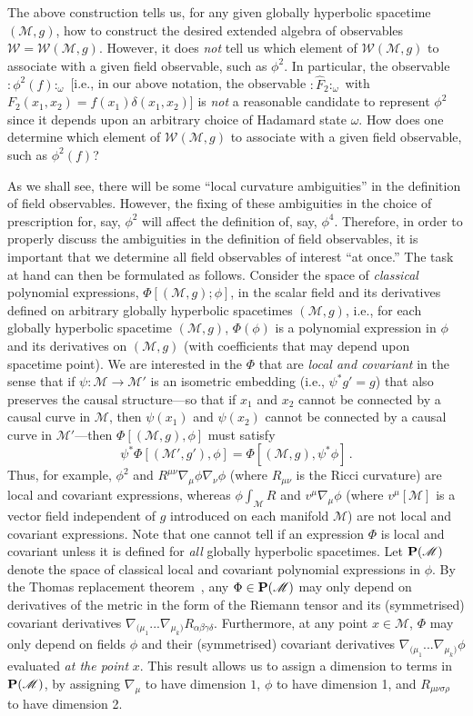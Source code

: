 \documentclass[12pt]{article}
\newcommand{\eW}{\mathscr{W}}
\newcommand{\M}{\mathscr{M}}
\renewcommand{\O}{\Phi}
\renewcommand{\P}{{\bf P}}
\theoremstyle{plain}
\theoremstyle{definition}
\def\ben{\begin{equation}}
\def\een{\end{equation}}
\begin{document}
The above construction tells us, for any given globally hyperbolic spacetime $(\M, g)$, how to construct the desired
extended algebra of observables $\eW = \eW(\M,g)$. However, it does {\em not} tell us which element of $\eW(\M,g)$ to associate with a given field observable, such as $\phi^2$. In particular, the observable $:\phi^2(f):_{\omega}$ [i.e.,
in our above notation, the observable $:\hat{F}_2:_{\omega}$ with $F_2(x_1,x_2) = f(x_1) \delta(x_1,x_2)$] is {\em not} a reasonable
candidate to represent $\phi^2$ since it depends upon an arbitrary choice of Hadamard state $\omega$. How does one
determine which element of $\eW(\M,g)$ to associate with a given field observable, such as $\phi^2(f)$?

As we shall see, there will be some ``local curvature ambiguities'' in the definition of field observables. However, the
fixing of these ambiguities in the choice of prescription for, say, $\phi^2$ will affect the definition of, say, $\phi^4$. Therefore, in order to properly discuss the ambiguities in the definition of field observables,
it is important that we determine all field observables of interest ``at once.'' The task at hand can then be formulated
as follows. Consider the space of {\it classical} polynomial expressions,
$\O[(\M, g);\phi]$, in the scalar field and its derivatives defined on arbitrary globally hyperbolic spacetimes $(\M,g)$,
i.e., for each globally hyperbolic spacetime $(\M,g)$, $\O(\phi)$ is a polynomial expression in $\phi$ and its derivatives
on $(\M,g)$ (with coefficients that may depend upon spacetime point). We are interested in the $\O$ that are {\it local and covariant}
in the sense that if $\psi:\M \to \M'$ is an isometric embedding (i.e., $\psi^* g'=g$) that also preserves the causal structure---so that if $x_1$ and $x_2$ cannot be connected by a causal curve in $\M$, then $\psi(x_1)$ and $\psi(x_2)$ cannot
be connected by a causal curve in $\M'$---then $\O[(\M, g),\phi]$ must satisfy
\ben
\psi^* \O[(\M',g'), \phi] = \O[(\M,g),\psi^* \phi] \, .
\een
Thus, for example, $\phi^2$ and $R^{\mu\nu} \nabla_\mu \phi \nabla_\nu \phi$ (where $R_{\mu\nu}$ is the Ricci curvature) are local and covariant expressions,
whereas $\phi \int_\M R$ and $v^\mu \nabla_\mu \phi$ (where $v^\mu[\M]$ is a vector field independent of $g$ introduced on each manifold $\M$) are not local and covariant expressions. Note that one cannot tell if an expression $\O$
is local and covariant unless it is defined for {\it all} globally hyperbolic spacetimes.
Let $\P(\M)$ denote the space of classical local and covariant polynomial expressions in $\phi$.
By the Thomas replacement theorem~\cite{iyerwald}, any $\O \in \P(\M)$ may only depend on derivatives of the metric in the form of the Riemann tensor and its (symmetrised) covariant derivatives $\nabla_{(\mu_1} ... \nabla_{\mu_k)} R_{\alpha\beta\gamma\delta}$. Furthermore, at any
point $x \in \M$, $\O$ may only depend on fields $\phi$ and their (symmetrised) covariant derivatives $\nabla_{(\mu_1} ... \nabla_{\mu_k)} \phi$ evaluated {\em at the point} $x$. This result allows us to assign a dimension to terms in $\P (\M)$, by assigning $\nabla_\mu$ to have dimension $1$, $\phi$ to have dimension 1, and $R_{\mu\nu\sigma\rho}$ to have dimension 2.
\end{document}
